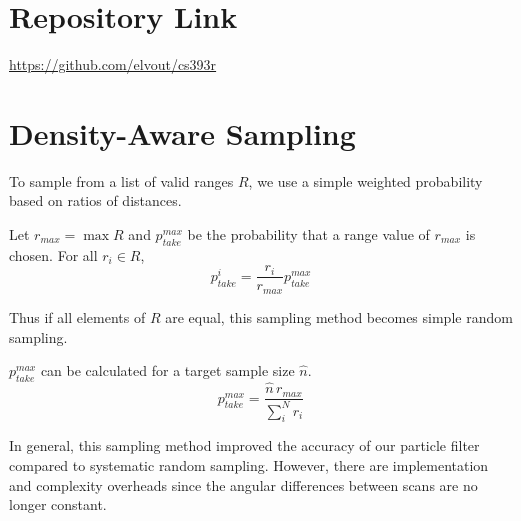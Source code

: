 \documentclass[11pt]{article}
\begin{document}
\section{Repository Link}
\href{https://github.com/elvout/cs393r}{https://github.com/elvout/cs393r}


\appendix
\section{Density-Aware Sampling}
\label{densityawaresampling}

To sample from a list of valid ranges $R$, we use a simple weighted probability
based on ratios of distances.

Let $r_{max} = \max{R}$ and $p_{take}^{max}$ be the probability that a range
value of $r_{max}$ is chosen. For all $r_i \in R$,
$$ p_{take}^{i} = \frac{r_i}{r_{max}} p_{take}^{max} $$

Thus if all elements of $R$ are equal, this sampling method becomes
simple random sampling.

$p_{take}^{max}$ can be calculated for a target sample size $\hat{n}$.
$$ p_{take}^{max} = \frac{\hat{n}\,r_{max}}{\sum\limits_{i}^{N} r_i}$$

\noindent
In general, this sampling method improved the accuracy of our particle filter
compared to systematic random sampling. However, there are implementation and
complexity overheads since the angular differences between scans are no longer
constant.
\end{document}
